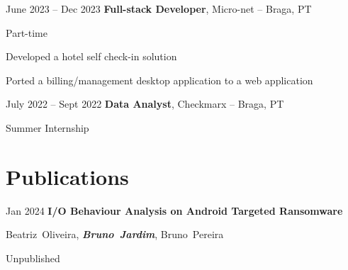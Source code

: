 \documentclass[10pt, letterpaper]{article}
\begin{document}
        \vspace{0.10 cm}
        \vspace{0.2 cm}

        \begin{twocolentry}{
            June 2023 – Dec 2023
        }
            \textbf{Full-stack Developer}, Micro-net -- Braga, PT\end{twocolentry}
        Part-time
        \vspace{0.10 cm}
        \begin{onecolentry}
            \begin{highlights}
                \item Developed a hotel self check-in solution
                \item Ported a billing/management desktop application to a web application 
            \end{highlights}
        \end{onecolentry}

        \vspace{0.10 cm}
        \vspace{0.2 cm}
            
        \begin{twocolentry}{
            July 2022 – Sept 2022
        }
            \textbf{Data Analyst}, Checkmarx -- Braga, PT\end{twocolentry}
        Summer Internship
        

        

    
    \section{Publications}



        
        \begin{samepage}
            \begin{twocolentry}{
                Jan 2024
            }
                \textbf{I/O Behaviour Analysis on Android Targeted Ransomware}
            \end{twocolentry}

            \vspace{0.10 cm}
            
            \begin{onecolentry}
                \mbox{Beatriz Oliveira}, \mbox{\textbf{\textit{Bruno Jardim}}}, \mbox{Bruno Pereira}

                \vspace{0.10 cm}
            Unpublished
        \end{onecolentry}
        \end{samepage}
\end{document}

